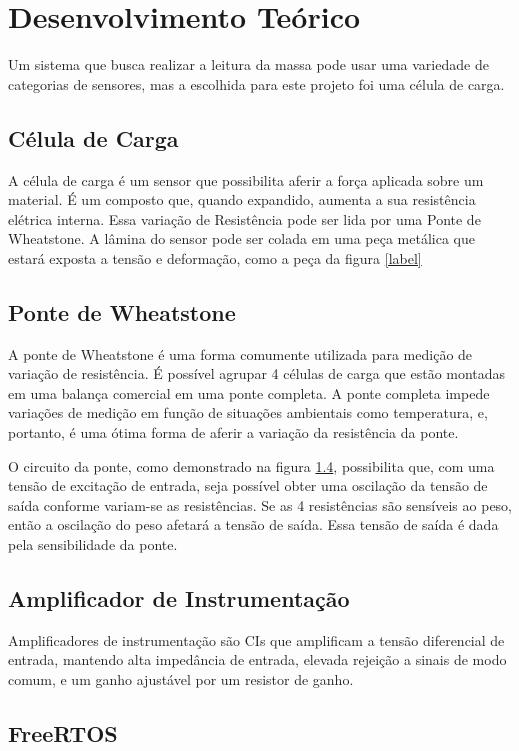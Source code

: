 \documentclass[a4paper, 12pt]{article}
\begin{document}
	\section{Desenvolvimento Teórico}
	Um sistema que busca realizar a leitura da massa pode usar uma variedade de categorias de sensores, mas a escolhida para este projeto foi uma célula de carga.
	
	\subsection{Célula de Carga}
	
	A célula de carga é um sensor que possibilita aferir a força aplicada sobre um material. É um composto que, quando expandido, aumenta a sua resistência elétrica interna. Essa variação de Resistência pode ser lida por uma Ponte de Wheatstone. A lâmina do sensor pode ser colada em uma peça metálica que estará exposta a tensão e deformação, como a peça da figura \ref{label}
	
	\subsection{Ponte de Wheatstone}
	
	A ponte de Wheatstone é uma forma comumente utilizada para medição de variação de resistência. É possível agrupar 4 células de carga que estão montadas em uma balança comercial em uma ponte completa. A ponte completa impede variações de medição em função de situações ambientais como temperatura, e, portanto, é uma ótima forma de aferir a variação da resistência da ponte. 
	
	O circuito da ponte, como demonstrado na figura \ref{}, possibilita que, com uma tensão de excitação de entrada, seja possível obter uma oscilação da tensão de saída conforme variam-se as resistências. Se as 4 resistências são sensíveis ao peso, então a oscilação do peso afetará a tensão de saída. Essa tensão de saída é dada pela sensibilidade da ponte.
	
	\subsection{Amplificador de Instrumentação}
	Amplificadores de instrumentação são CIs que amplificam a tensão diferencial de entrada, mantendo alta impedância de entrada, elevada rejeição a sinais de modo comum, e um ganho ajustável por um resistor de ganho. 
	
	\subsection{FreeRTOS}
	
\end{document}
